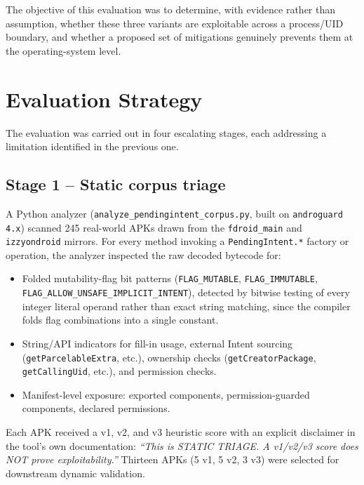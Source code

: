 \documentclass[11pt]{article}
\begin{document}
The objective of this evaluation was to determine, with evidence rather than assumption,
whether these three variants are exploitable across a process/UID boundary, and whether
a proposed set of mitigations genuinely prevents them at the operating-system level.

\section{Evaluation Strategy}

The evaluation was carried out in four escalating stages, each addressing a limitation
identified in the previous one.

\subsection*{Stage 1 -- Static corpus triage}
A Python analyzer (\texttt{analyze\_pendingintent\_corpus.py}, built on
\texttt{androguard 4.x}) scanned 245 real-world APKs drawn from the \texttt{fdroid\_main}
and \texttt{izzyondroid} mirrors. For every method invoking a
\texttt{PendingIntent.*} factory or operation, the analyzer inspected the raw decoded
bytecode for:
\begin{itemize}[leftmargin=1.5em]
    \item Folded mutability-flag bit patterns (\texttt{FLAG\_MUTABLE},
    \texttt{FLAG\_IMMUTABLE}, \texttt{FLAG\_ALLOW\_UNSAFE\_IMPLICIT\_INTENT}), detected
    by bitwise testing of every integer literal operand rather than exact string
    matching, since the compiler folds flag combinations into a single constant.
    \item String/API indicators for fill-in usage, external Intent sourcing
    (\texttt{getParcelableExtra}, etc.), ownership checks
    (\texttt{getCreatorPackage}, \texttt{getCallingUid}, etc.), and permission checks.
    \item Manifest-level exposure: exported components, permission-guarded components,
    declared permissions.
\end{itemize}
Each APK received a v1, v2, and v3 heuristic score with an explicit disclaimer in the
tool's own documentation: \emph{``This is STATIC TRIAGE. A v1/v2/v3 score does NOT prove
exploitability.''} Thirteen APKs (5 v1, 5 v2, 3 v3) were selected for downstream dynamic
validation.
\end{document}
